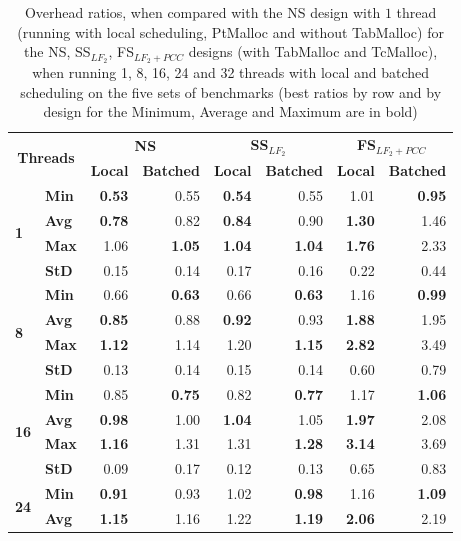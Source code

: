 \documentclass{llncs}
\begin{document}
\begin{table}[!ht]
\centering
\caption{Overhead ratios, when compared with the NS design with $1$
  thread (running with local scheduling, PtMalloc and without
  TabMalloc) for the NS, SS$_{LF_2}$, FS$_{LF_2+PCC}$ designs (with
  TabMalloc and TcMalloc), when running 1, 8, 16, 24 and 32 threads
  with local and batched scheduling on the five sets of benchmarks
  (best ratios by row and by design for the Minimum, Average and
  Maximum are in bold)}
\begin{tabular}{ll|rr|rr|rr}
\hline\hline
\multicolumn{2}{c|}{\multirow{2}{*}{\bf Threads}} &
\multicolumn{2}{c|}{\multirow{1}{*}{\bf NS}} &
\multicolumn{2}{c}{\multirow{1}{*}{\bf SS$_{LF_2}$}} & 
\multicolumn{2}{|c}{\multirow{1}{*}{\bf FS$_{LF_2+PCC}$}}\\ \cline{3-8}
& 
& \multicolumn{1}{c}{\bf Local}
& \multicolumn{1}{c}{\bf Batched}
& \multicolumn{1}{|c}{\bf Local}
& \multicolumn{1}{c}{\bf Batched}
& \multicolumn{1}{|c}{\bf Local}
& \multicolumn{1}{c}{\bf Batched}\\
\hline
\multirow{4}{*}{\bf 1}
& {\bf Min }& {\bf 0.53}& 0.55& {\bf 0.54}& 0.55& 1.01& {\bf 0.95}\\
& {\bf Avg }& {\bf 0.78}& 0.82& {\bf 0.84}& 0.90& {\bf 1.30}& 1.46\\
& {\bf Max }& 1.06& {\bf 1.05}& {\bf 1.04}& {\bf 1.04}& {\bf 1.76}& 2.33\\
& {\bf StD }& 0.15& 0.14& 0.17& 0.16& 0.22& 0.44\\
\hline
\multirow{4}{*}{\bf 8}
& {\bf Min }& 0.66& {\bf 0.63}& 0.66& {\bf 0.63}& 1.16&{\bf  0.99}\\
& {\bf Avg }& {\bf 0.85}& 0.88& {\bf 0.92}& 0.93& {\bf 1.88}& 1.95\\
& {\bf Max }& {\bf 1.12}& 1.14& 1.20& {\bf 1.15}& {\bf 2.82}& 3.49\\
& {\bf StD }& 0.13& 0.14& 0.15& 0.14& 0.60& 0.79\\
\hline
\multirow{4}{*}{\bf 16}
& {\bf Min }& 0.85& {\bf 0.75}& 0.82& {\bf 0.77}& 1.17& {\bf 1.06}\\
& {\bf Avg }& {\bf 0.98}& 1.00& {\bf 1.04}& 1.05& {\bf 1.97}& 2.08\\
& {\bf Max }& {\bf 1.16}& 1.31& 1.31& {\bf 1.28}& {\bf 3.14}& 3.69\\
& {\bf StD }& 0.09& 0.17& 0.12& 0.13& 0.65& 0.83\\
\hline
\multirow{4}{*}{\bf 24}
& {\bf Min }& {\bf 0.91}& 0.93& 1.02& {\bf 0.98}& 1.16& {\bf 1.09}\\
& {\bf Avg }& {\bf 1.15}& 1.16& 1.22& {\bf 1.19}& {\bf 2.06}& 2.19\\

\end{tabular}
\end{table}
\end{document}
